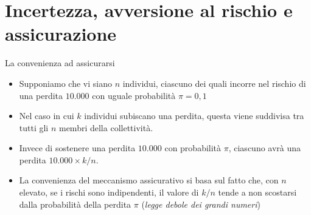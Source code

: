 \documentclass[aspectratio=64,12pt]{beamer}
\begin{document}
\section{Incertezza, avversione al rischio e assicurazione}

\begin{frame}{La convenienza ad assicurarsi}
\begin{itemize}
\item Supponiamo che vi siano $n$ individui, ciascuno dei quali incorre nel
rischio di una perdita $10.000$ con uguale probabilità $\pi=0,1$
\item Nel caso in cui $k$ individui subiscano una perdita, questa viene
suddivisa tra tutti gli $n$ membri della collettività.
\item Invece di sostenere una perdita $10.000$ con probabilità $\pi$, ciascuno
avrà una perdita $10.000\times k/n$.
\item La convenienza del meccanismo assicurativo si basa sul fatto che, con $n$
elevato, \alert{se i rischi sono indipendenti}, il valore di $k/n$ tende a non
scostarsi dalla probabilità della perdita $\pi$ (\emph{legge debole dei grandi
numeri})
\end{itemize}
\end{frame}
\end{document}
